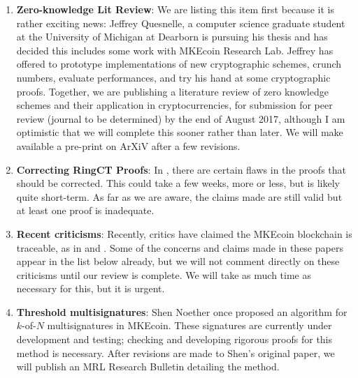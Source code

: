 \documentclass[12pt,english]{mrl}
\theoremstyle{definition}
\numberwithin{equation}{section}
\numberwithin{figure}{section}
\numberwithin{equation}{section}
\numberwithin{equation}{section}
\numberwithin{figure}{section}
\begin{document}
\begin{enumerate}[1.]

    \item \textbf{Zero-knowledge Lit Review}: We are listing this item first because it is rather exciting news: Jeffrey Quesnelle, a computer science graduate student at the University of Michigan at Dearborn is pursuing his thesis and has decided this includes some work with MKEcoin Research Lab. Jeffrey has offered to prototype implementations of new cryptographic schemes, crunch numbers, evaluate performances, and try his hand at some cryptographic proofs. Together, we are publishing a literature review of zero knowledge schemes and their application in cryptocurrencies, for submission for peer review (journal to be determined) by the end of August 2017, although I am optimistic that we will complete this sooner rather than later. We will make available a pre-print on ArXiV after a few revisions.
    
    
    \item \textbf{Correcting RingCT Proofs}: In \cite{noether2016ring}, there are certain flaws in the proofs that should be corrected. This could take a few weeks, more or less, but is likely quite short-term. As far as we are aware, the claims made are still valid but at least one proof is inadequate.
    
    \item \textbf{Recent criticisms}: Recently, critics have claimed the MKEcoin blockchain is traceable, as in \cite{miller2017empirical} and \cite{kumar2017traceability}. Some of the concerns and claims made in these papers appear in the list below already, but we will not comment directly on these criticisms until our review is complete. We will take as much time as necessary for this, but it is urgent.
    
    \item \textbf{Threshold multisignatures}: Shen Noether once proposed an algorithm for  $k$-of-$N$ multisignatures in MKEcoin.  These signatures are currently under development and testing; checking and developing rigorous proofs for this method is necessary. After revisions are made to Shen's original paper, we will publish an MRL Research Bulletin detailing the method.
    
    
    
    
    

\end{enumerate}
\end{document}
